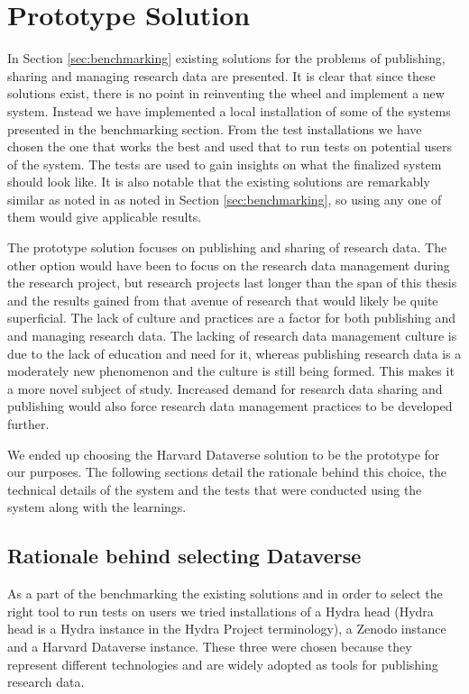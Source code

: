 \chapter{Prototype Solution}
\label{chapter:prototype}

In Section \ref{sec:benchmarking} existing solutions for the problems of
publishing, sharing and managing research data are presented. It is clear that
since these solutions exist, there is no point in reinventing the wheel and
implement a new system. Instead we have implemented a local installation
of some of the systems presented in the benchmarking section. From the test
installations we have chosen the one that works the best and used that to
run tests on potential users of the system. The tests are used to gain insights
on what the finalized system should look like. It is also notable
that the existing solutions are remarkably similar as noted in as noted
in Section \ref{sec:benchmarking}, so using any one of them
would give applicable results.

The prototype solution focuses on publishing and sharing of research data. The
other option would have been to focus on the research data management during
the research project, but research projects last longer than the span of this
thesis and the results gained from that avenue of research that would likely be quite superficial.
The lack of culture and practices are a factor for both publishing and
and managing research data. The lacking of research data management culture is
due to the lack of education and need for it, whereas publishing research data
is a moderately new phenomenon and the culture is still being formed. This makes it a more novel subject
of study. Increased demand for research data sharing and publishing would also
force research data management practices to be developed further.

We ended up choosing the Harvard Dataverse solution to be the prototype for our
purposes. The following sections detail the rationale behind this choice, the
technical details of the system and the tests that were conducted using the
system along with the learnings.

\section{Rationale behind selecting Dataverse}

As a part of the benchmarking the existing solutions and in order to select the
right tool to run tests on users we tried installations of a Hydra head (Hydra head is a
Hydra instance in the Hydra Project terminology), a
Zenodo instance and a Harvard Dataverse instance. These three were chosen
because they represent different technologies and are widely adopted as tools
for publishing research data.

